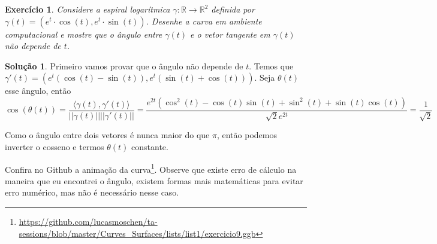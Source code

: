 \documentclass[a4paper,12pt]{article}
\newcommand{\R}{\mathbb{R}}
\theoremstyle{exer}
\newtheorem{exercise}{Exercício}
\theoremstyle{definition}
\newtheorem{solution}{Solução}
\theoremstyle{plain}
\begin{document}
\begin{exercise}
    Considere a espiral logarítmica $\gamma : \R \to \R^2$ definida por
    $\gamma(t) = (e^t\cdot\cos(t), e^t\cdot\sin(t))$. Desenhe a curva em
    ambiente computacional e mostre que o ângulo entre $\gamma(t)$ e o vetor tangente em $\gamma(t)$ não depende de $t$.
\end{exercise}

\begin{solution}
    Primeiro vamos provar que o ângulo não depende de $t$. Temos que $\gamma
    '(t) = (e^t(\cos(t) - \sin(t)), e^t(\sin(t) + \cos(t)))$. Seja $\theta(t)$
    esse ângulo, então
    $$
    \cos(\theta(t)) = \frac{\langle \gamma(t), \gamma '(t) \rangle}{||\gamma(t)||||\gamma '(t)||} = \frac{e^{2t}(\cos^2(t) - \cos(t)\sin(t) + \sin^2(t) + \sin(t)\cos(t))}{\sqrt{2}e^{2t}} = \frac{1}{\sqrt{2}}
    $$

    Como o ângulo entre dois vetores é nunca maior do que $\pi$, então podemos
    inverter o cosseno e termos $\theta(t)$ constante. 

    Confira no Github a animação da
    curva\footnote{\url{https://github.com/lucasmoschen/ta-sessions/blob/master/Curves_Surfaces/lists/list1/exercicio9.ggb}}.
    Observe que existe erro de cálculo na maneira que eu encontrei o ângulo,
    existem formas mais matemáticas para evitar erro numérico, mas não é
    necessário nesse caso. 

\end{solution}
\end{document}
